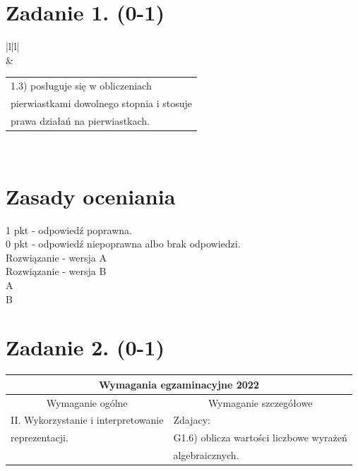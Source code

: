 \documentclass[10pt]{article}
\begin{document}
\section*{Zadanie 1. (0-1)}
\begin{center}
\begin{tabular}{|l|l|}
\hline
{} \\
\hline
{} & \begin{tabular}{l}
1.3) posługuje się w obliczeniach \\
pierwiastkami dowolnego stopnia i stosuje \\
prawa działań na pierwiastkach. \\
\end{tabular} \\
\hline
\end{tabular}
\end{center}

\section*{Zasady oceniania}
1 pkt - odpowiedź poprawna.\\
0 pkt - odpowiedź niepoprawna albo brak odpowiedzi.\\
Rozwiązanie - wersja A\\
Rozwiązanie - wersja B\\
A\\
B

\section*{Zadanie 2. (0-1)}
\begin{center}
\begin{tabular}{|l|l|}
\hline
\multicolumn{2}{|c|}{Wymagania egzaminacyjne 2022} \\
\hline
\multicolumn{1}{|c|}{Wymaganie ogólne} & \multicolumn{1}{c|}{Wymaganie szczegółowe} \\
\hline
\multicolumn{1}{|c|}{II. Wykorzystanie i interpretowanie} & Zdajacy: \\
reprezentacji. & G1.6) oblicza wartości liczbowe wyrażeń \\
 & algebraicznych. \\
\hline
\end{tabular}
\end{center}
\end{document}
